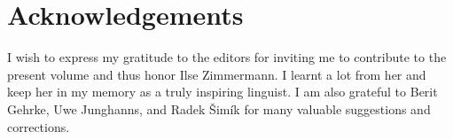 \documentclass[output=paper,colorlinks,citecolor=brown]{langscibook}
\begin{document}
\section*{Acknowledgements}

I wish to express my gratitude to the editors for inviting me to contribute to the present volume and thus honor Ilse Zimmermann. I learnt a lot from her and keep her in my memory as a truly inspiring linguist. I am also grateful to Berit Gehrke, Uwe Junghanns, and Radek Šimík for many valuable suggestions and corrections.

\printbibliography[heading=subbibliography,notkeyword=this]


\end{document}

